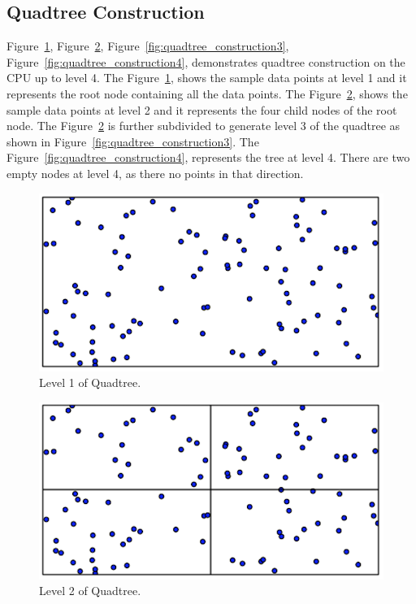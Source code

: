 \subsection{Quadtree Construction}

Figure~\ref{fig:quadtree_construction1},
Figure~\ref{fig:quadtree_construction2},
Figure~\ref{fig:quadtree_construction3},
Figure~\ref{fig:quadtree_construction4}, demonstrates quadtree
construction on the CPU up to level 4.
The Figure~\ref{fig:quadtree_construction1}, shows the sample data points
at level 1 and it represents the root node containing all the data points.
The Figure~\ref{fig:quadtree_construction2}, shows the sample data points
at level 2 and it represents the four child nodes of the root node.
The Figure~\ref{fig:quadtree_construction2} is further subdivided to generate 
level 3 of the quadtree as shown in Figure~\ref{fig:quadtree_construction3}.
The Figure~\ref{fig:quadtree_construction4}, represents the tree at level 4.
There are two empty nodes at level 4, as there no points in that direction. 

 \begin{figure}[H]   
 \centering
 \vspace{0.5in}
 \includegraphics[scale=0.5]{Images/Quadtree_construction1}
 \vspace{0.5in}
 \caption{Level 1 of Quadtree.}
 \label{fig:quadtree_construction1}
 \end{figure}


 \begin{figure}[H]
 \centering
 \vspace{0.5in}
 \includegraphics[scale=0.5]{Images/Quadtree_construction2}
 \vspace{0.5in}
 \caption{Level 2 of Quadtree.}
 \label{fig:quadtree_construction2}
 \end{figure}  

